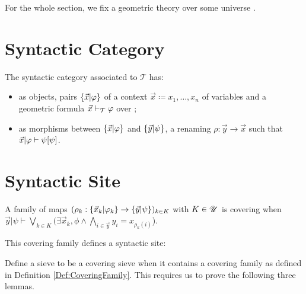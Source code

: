 \newcommand{\tphi}{\tilde{\phi}}
\newcommand{\tpsi}{\tilde{\psi}}
\newcommand{\tzeta}{\tilde{\zeta}}
\newcommand{\ox}{\overline{x}}
\newcommand{\oz}{\overline{z}}

For the whole section, we fix a geometric theory \thT{} over some universe \Univ{}.

\section{Syntactic Category}
\begin{definition}
  \leanok
  The syntactic category associated to $\mathcal{T}$ has:
  \begin{itemize}
    \item as objects, pairs $\{ \vec{x} | \varphi \}$ of a context $\vec{x} \coloneq x_1, \ldots, x_{n}$ of variables and a geometric formula $\vec{x} \vdash_{\mathcal{T}} \varphi$ over \thT{};
    \item as morphisms between $\{ \vec{x} | \varphi \}$ and $\{ \vec{y} | \psi \}$, a renaming $\rho : \vec{y} \to \vec{x}$ such that $\vec{x} | \varphi \vdash {\psi}[{\psi}]$.
  \end{itemize}
\end{definition}



\section{Syntactic Site}
\begin{definition}
  \label{Def:CoveringFamily}
  \leanok
  A family of maps $(\rho_k : \{ \vec{x}_k | \varphi_k \}\to \{ \vec{y} | \psi \})_{k \in K}$ with $K \in \mathscr{U}$ is covering when
  $\vec{y} | \psi \vdash \bigvee_{k \in K} (\exists \vec{x}_k, \phi \wedge \bigwedge_{i \in \vec{y}} y_i = x_{\rho_k(i)}$).
\end{definition}

This covering family defines a syntactic site:

\begin{definition}
  Define a sieve to be a covering sieve when it contains a covering family as defined in Definition \ref{Def:CoveringFamily}. This requires us to prove the following three lemmas.
\end{definition}

